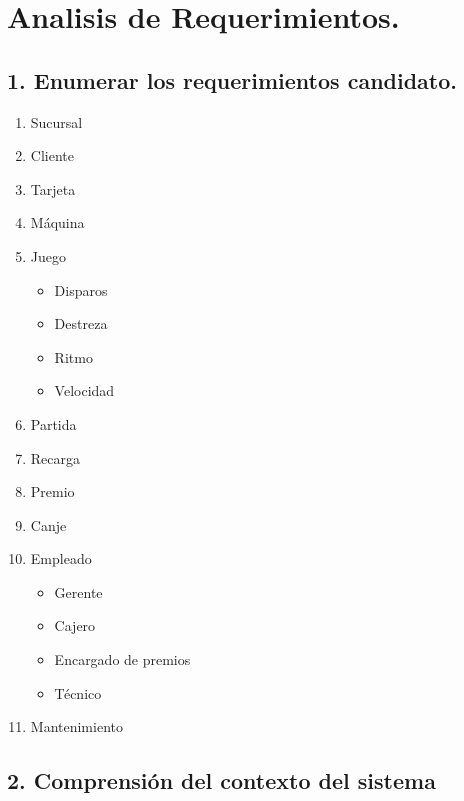\section{Analisis de Requerimientos.}
\subsection*{1. Enumerar los requerimientos candidato.}

\begin{enumerate}
    \item Sucursal
    \item Cliente
    \item Tarjeta
    \item Máquina
    \item Juego
    \begin{itemize}
        \item Disparos
        \item Destreza
        \item Ritmo
        \item Velocidad
    \end{itemize}
    \item Partida
    \item Recarga
    \item Premio
    \item Canje
    \item Empleado
    \begin{itemize}
        \item Gerente
        \item Cajero
        \item Encargado de premios
        \item Técnico
    \end{itemize}
    \item Mantenimiento
\end{enumerate}

\subsection*{2. Comprensión del contexto del sistema}

